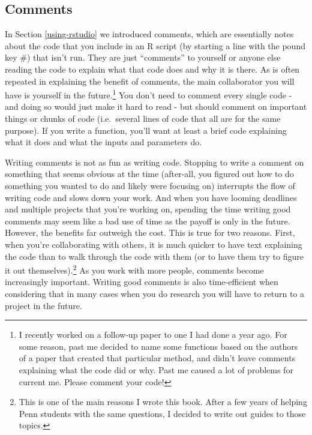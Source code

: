 \documentclass[
]{krantz}
\begin{document}
\hypertarget{comments}{%
\subsection{Comments}\label{comments}}

In Section \ref{using-rstudio} we introduced comments, which are essentially notes about the code that you include in an R script (by starting a line with the pound key \#) that isn't run. They are just ``comments'' to yourself or anyone else reading the code to explain what that code does and why it is there. As is often repeated in explaining the benefit of comments, the main collaborator you will have is yourself in the future.\footnote{I recently worked on a follow-up paper to one I had done a year ago. For some reason, past me decided to name some functions based on the authors of a paper that created that particular method, and didn't leave comments explaining what the code did or why. Past me caused a lot of problems for current me. Please comment your code!} You don't need to comment every single code - and doing so would just make it hard to read - but should comment on important things or chunks of code (i.e.~several lines of code that all are for the same purpose). If you write a function, you'll want at least a brief code explaining what it does and what the inputs and parameters do.

Writing comments is not as fun as writing code. Stopping to write a comment on something that seems obvious at the time (after-all, you figured out how to do something you wanted to do and likely were focusing on) interrupts the flow of writing code and slows down your work. And when you have looming deadlines and multiple projects that you're working on, spending the time writing good comments may seem like a bad use of time as the payoff is only in the future. However, the benefits far outweigh the cost. This is true for two reasons. First, when you're collaborating with others, it is much quicker to have text explaining the code than to walk through the code with them (or to have them try to figure it out themselves).\footnote{This is one of the main reasons I wrote this book. After a few years of helping Penn students with the same questions, I decided to write out guides to those topics.} As you work with more people, comments become increasingly important. Writing good comments is also time-efficient when considering that in many cases when you do research you will have to return to a project in the future.
\end{document}
